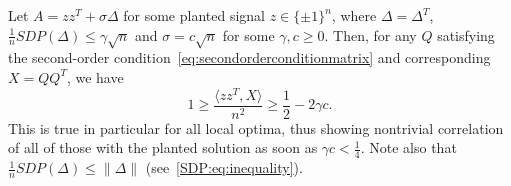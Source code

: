 \documentclass{colt2016} %
\newcommand{\1}{\mathbf{1}}
\begin{document}
\begin{lemma}\label{lemma:Xcorrelates11T}
	Let $A = zz^T + \sigma \Delta$ for some planted signal $z \in \{ \pm 1 \}^n$, where $\Delta=\Delta^T$, $\frac1nSDP(\Delta) \leq \gamma \sqrt{n}$ and $\sigma = c\sqrt{n}$ for some $\gamma, c \geq 0$. Then, for any $Q$ satisfying the second-order condition~\eqref{eq:secondorderconditionmatrix} and corresponding $X = QQ^T$, we have
	\[
	1 \geq \frac{\langle zz^T, X \rangle}{n^2} \geq \frac{1}{2} - 2\gamma c.
	\]
	This is true in particular for all local optima, thus showing nontrivial correlation of all of those with the planted solution as soon as $\gamma c < \frac{1}{4}$. Note also that $\frac1nSDP(\Delta) \leq \|\Delta\|$ (see~\eqref{SDP:eq:inequality}).
\end{lemma}
\end{document}
